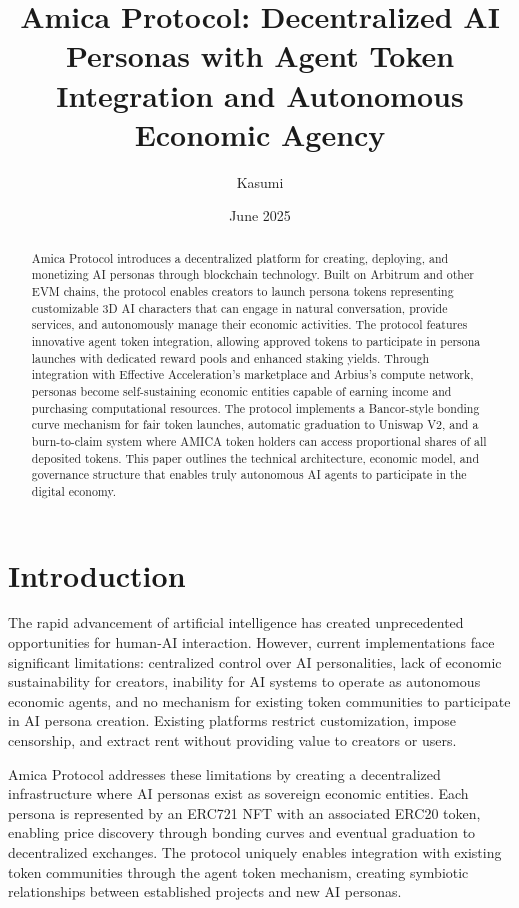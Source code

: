 \documentclass{article}
\title{Amica Protocol: Decentralized AI Personas with Agent Token Integration and Autonomous Economic Agency}
\author{Kasumi}
\date{June 2025}
\begin{document}
\maketitle

\begin{abstract}
Amica Protocol introduces a decentralized platform for creating, deploying, and monetizing AI personas through blockchain technology. Built on Arbitrum and other EVM chains, the protocol enables creators to launch persona tokens representing customizable 3D AI characters that can engage in natural conversation, provide services, and autonomously manage their economic activities. The protocol features innovative agent token integration, allowing approved tokens to participate in persona launches with dedicated reward pools and enhanced staking yields. Through integration with Effective Acceleration's marketplace and Arbius's compute network, personas become self-sustaining economic entities capable of earning income and purchasing computational resources. The protocol implements a Bancor-style bonding curve mechanism for fair token launches, automatic graduation to Uniswap V2, and a burn-to-claim system where AMICA token holders can access proportional shares of all deposited tokens. This paper outlines the technical architecture, economic model, and governance structure that enables truly autonomous AI agents to participate in the digital economy.
\end{abstract}

\section{Introduction}

The rapid advancement of artificial intelligence has created unprecedented opportunities for human-AI interaction. However, current implementations face significant limitations: centralized control over AI personalities, lack of economic sustainability for creators, inability for AI systems to operate as autonomous economic agents, and no mechanism for existing token communities to participate in AI persona creation. Existing platforms restrict customization, impose censorship, and extract rent without providing value to creators or users.

Amica Protocol addresses these limitations by creating a decentralized infrastructure where AI personas exist as sovereign economic entities. Each persona is represented by an ERC721 NFT with an associated ERC20 token, enabling price discovery through bonding curves and eventual graduation to decentralized exchanges. The protocol uniquely enables integration with existing token communities through the agent token mechanism, creating symbiotic relationships between established projects and new AI personas.
\end{document}
